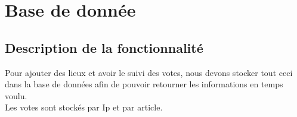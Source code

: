 \documentclass[10pt,a4paper]{report}
\begin{document}

\section{Base de donnée}

\subsection{Description de la fonctionnalité}
\begin{flushleft}
Pour ajouter des lieux et avoir le suivi des votes, nous devons stocker tout ceci dans la base de données afin de pouvoir retourner les informations en temps voulu. \\

Les votes sont stockés par Ip et par article. \\
\end{flushleft}
\end{document}
